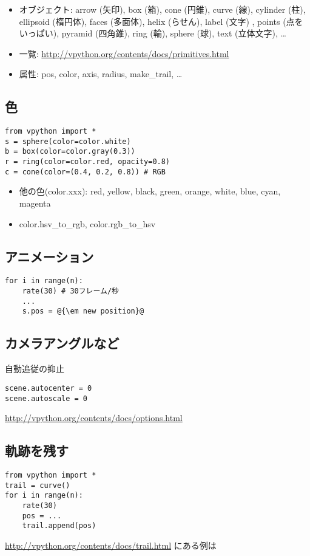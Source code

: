 \documentclass[landscape,7pt,dvipdfmx]{article}
\newcommand{\aka}[1]{{\color{red}{#1}}}
\begin{document}
\begin{multicols*}{3}
\begin{itemize}
\item オブジェクト: arrow (矢印), box (箱), cone (円錐), 
  curve (線), cylinder (柱), 
  ellipsoid (楕円体), faces (多面体), helix (らせん), 
  label (文字) , points (点をいっぱい), pyramid (四角錐), 
  ring (輪), sphere (球), text (立体文字), \ldots
\item 一覧: \url{http://vpython.org/contents/docs/primitives.html}
\item 属性: pos, color, axis, radius, make\_trail, \ldots
\end{itemize}

\subsection{色}
\begin{lstlisting}
from vpython import *
s = sphere(color=color.white)
b = box(color=color.gray(0.3))
r = ring(color=color.red, opacity=0.8)
c = cone(color=(0.4, 0.2, 0.8)) # RGB
\end{lstlisting}

\begin{itemize}
\item 他の色(color.xxx): red, yellow, black, green, orange, white, blue, cyan, magenta
\item color.hsv\_to\_rgb, color.rgb\_to\_hsv
\end{itemize}

\subsection{アニメーション}
\begin{lstlisting}
for i in range(n):
    rate(30) # 30フレーム/秒
    ...
    s.pos = @{\em new position}@
\end{lstlisting}

\subsection{カメラアングルなど}
自動追従の抑止
\begin{lstlisting}
scene.autocenter = 0
scene.autoscale = 0
\end{lstlisting}
\url{http://vpython.org/contents/docs/options.html}

\subsection{軌跡を残す}
\begin{lstlisting}
from vpython import *
trail = curve()
for i in range(n):
    rate(30)
    pos = ...
    trail.append(pos)
\end{lstlisting}
\url{http://vpython.org/contents/docs/trail.html}
にある例は\aka{うまくいかない}


\end{multicols*}
\end{document}
